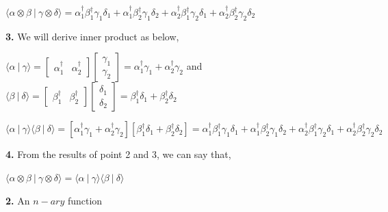 \documentclass [12pt]{article}
\theoremstyle{definition}
\newcommand{\braket}[2]{\langle #1 \ | \ #2 \rangle}
\newcommand{\tensor}[2]{ #1 \otimes  #2 }
\begin{document}
\phantom{1000em} $\braket{\tensor{\alpha}{\beta}}{\tensor{\gamma}{\delta}} = \alpha^{\dag}_{1}\beta^{\dag}_{1}\gamma_{1}\delta_{1} + \alpha^{\dag}_{1}\beta^{\dag}_{2}\gamma_{1}\delta_{2} + \alpha^{\dag}_{2}\beta^{\dag}_{1}\gamma_{2}\delta_{1} + \alpha^{\dag}_{2}\beta^{\dag}_{2}\gamma_{2}\delta_{2}$

\phantom{1em} {\bf 3.} We will derive inner product as below,

\phantom{1000em} $\braket{\alpha}{\gamma} = \begin{bmatrix} \alpha^{\dag}_{1} & \alpha^{\dag}_{2}\end{bmatrix}\begin{bmatrix} \gamma_{1} \\ \gamma_{2}\end{bmatrix} = \alpha^{\dag}_{1}\gamma_{1} + \alpha^{\dag}_{2}\gamma_{2}$ and $\braket{\beta}{\delta} = \begin{bmatrix} \beta^{\dag}_{1} & \beta^{\dag}_{2}\end{bmatrix}\begin{bmatrix} \delta_{1} \\ \delta_{2}\end{bmatrix} = \beta^{\dag}_{1}\delta_{1} + \beta^{\dag}_{2}\delta_{2}$

\phantom{1000em} $\braket{\alpha}{\gamma} \braket{\beta}{\delta} = [\alpha^{\dag}_{1}\gamma_{1} + \alpha^{\dag}_{2}\gamma_{2}][\beta^{\dag}_{1}\delta_{1} + \beta^{\dag}_{2}\delta_{2}] = \alpha^{\dag}_{1}\beta^{\dag}_{1}\gamma_{1}\delta_{1} + \alpha^{\dag}_{1}\beta^{\dag}_{2}\gamma_{1}\delta_{2} + \alpha^{\dag}_{2}\beta^{\dag}_{1}\gamma_{2}\delta_{1} + \alpha^{\dag}_{2}\beta^{\dag}_{2}\gamma_{2}\delta_{2}$

\phantom{1em} {\bf 4.} From the results of point 2 and 3, we can say that,

\phantom{1000em} $\braket{\tensor{\alpha}{\beta}}{\tensor{\gamma}{\delta}} = \braket{\alpha}{\gamma} \braket{\beta}{\delta}$\\

\newpage

{\bf 2.} An $n-ary$ function 
\end{document}
